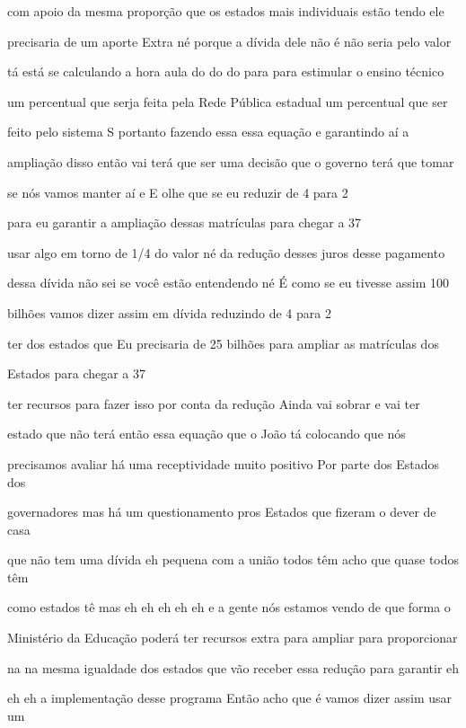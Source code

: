 \documentclass[a4paper,12pt]{article}
\begin{document}
com apoio da mesma proporção que os estados mais individuais estão tendo ele

precisaria de um aporte Extra né porque a dívida dele não é não seria pelo valor

tá está se calculando a hora aula do do do para para estimular o ensino técnico

um percentual que serja feita pela Rede Pública estadual um percentual que ser

feito pelo sistema S portanto fazendo essa essa equação e garantindo aí a

ampliação disso então vai terá que ser uma decisão que o governo terá que tomar

se nós vamos manter aí e E olhe que se eu reduzir de 4 para 2%

para eu garantir a ampliação dessas matrículas para chegar a 37%

usar algo em torno de 1/4 do valor né da redução desses juros desse pagamento

dessa dívida não sei se você estão entendendo né É como se eu tivesse assim 100

bilhões vamos dizer assim em dívida reduzindo de 4 para 2%

ter dos estados que Eu precisaria de 25 bilhões para ampliar as matrículas dos

Estados para chegar a 37%

ter recursos para fazer isso por conta da redução Ainda vai sobrar e vai ter

estado que não terá então essa equação que o João tá colocando que nós

precisamos avaliar há uma receptividade muito positivo Por parte dos Estados dos

governadores mas há um questionamento pros Estados que fizeram o dever de casa

que não tem uma dívida eh pequena com a união todos têm acho que quase todos têm

como estados tê mas eh eh eh eh eh e a gente nós estamos vendo de que forma o

Ministério da Educação poderá ter recursos extra para ampliar para proporcionar

na na mesma igualdade dos estados que vão receber essa redução para garantir eh

eh eh a implementação desse programa Então acho que é vamos dizer assim usar um
\end{document}
